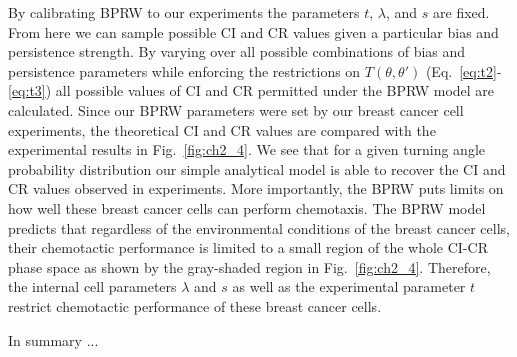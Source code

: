 By calibrating BPRW to our experiments the parameters $t$, $\lambda$, and $s$ are fixed. From here we can sample possible CI and CR values given a particular bias and persistence strength. By varying over all possible combinations of bias and persistence parameters while enforcing the restrictions on $T(\theta,\theta')$ (Eq.\ \ref{eq:t2}-\ref{eq:t3}) all possible values of CI and CR permitted under the BPRW model are calculated. Since our BPRW parameters were set by our breast cancer cell experiments, the theoretical CI and CR values are compared with the experimental results in  Fig.\ \ref{fig:ch2_4}. We see that for a given turning angle probability distribution our simple analytical model is able to recover the CI and CR values observed in experiments. More importantly, the BPRW puts limits on how well these breast cancer cells can perform chemotaxis. The BPRW model predicts that regardless of the environmental conditions of the breast cancer cells, their chemotactic performance is limited to a small region of the whole CI-CR phase space as shown by the gray-shaded region in Fig.\ \ref{fig:ch2_4}. Therefore, the internal cell parameters $\lambda$ and $s$ as well as the experimental parameter $t$ restrict chemotactic performance of these breast cancer cells.

In summary ...
